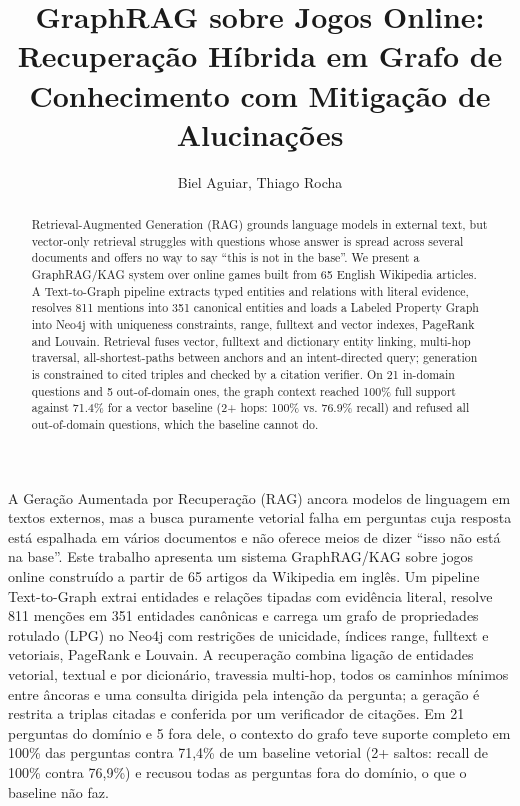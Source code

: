 \documentclass[12pt]{article}
\title{GraphRAG sobre Jogos Online: Recuperação Híbrida em Grafo de Conhecimento com Mitigação de Alucinações}
\author{Biel Aguiar, Thiago Rocha}
\begin{document}
\maketitle
\begin{abstract}
Retrieval-Augmented Generation (RAG) grounds language models in external text, but vector-only retrieval struggles with questions whose answer is spread across several documents and offers no way to say ``this is not in the base''. We present a GraphRAG/KAG system over online games built from 65 English Wikipedia articles. A Text-to-Graph pipeline extracts typed entities and relations with literal evidence, resolves 811 mentions into 351 canonical entities and loads a Labeled Property Graph into Neo4j with uniqueness constraints, range, fulltext and vector indexes, PageRank and Louvain. Retrieval fuses vector, fulltext and dictionary entity linking, multi-hop traversal, all-shortest-paths between anchors and an intent-directed query; generation is constrained to cited triples and checked by a citation verifier. On 21 in-domain questions and 5 out-of-domain ones, the graph context reached 100\% full support against 71.4\% for a vector baseline (2+ hops: 100\% vs. 76.9\% recall) and refused all out-of-domain questions, which the baseline cannot do.

\end{abstract}
\begin{resumo}
A Geração Aumentada por Recuperação (RAG) ancora modelos de linguagem em textos externos, mas a busca puramente vetorial falha em perguntas cuja resposta está espalhada em vários documentos e não oferece meios de dizer ``isso não está na base''. Este trabalho apresenta um sistema GraphRAG/KAG sobre jogos online construído a partir de 65 artigos da Wikipedia em inglês. Um pipeline Text-to-Graph extrai entidades e relações tipadas com evidência literal, resolve 811 menções em 351 entidades canônicas e carrega um grafo de propriedades rotulado (LPG) no Neo4j com restrições de unicidade, índices range, fulltext e vetoriais, PageRank e Louvain. A recuperação combina ligação de entidades vetorial, textual e por dicionário, travessia multi-hop, todos os caminhos mínimos entre âncoras e uma consulta dirigida pela intenção da pergunta; a geração é restrita a triplas citadas e conferida por um verificador de citações. Em 21 perguntas do domínio e 5 fora dele, o contexto do grafo teve suporte completo em 100\% das perguntas contra 71,4\% de um baseline vetorial (2+ saltos: recall de 100\% contra 76,9\%) e recusou todas as perguntas fora do domínio, o que o baseline não faz.

\end{resumo}
\end{document}
